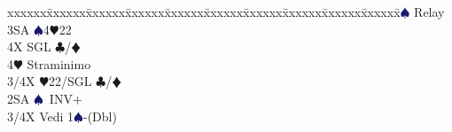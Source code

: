 \documentclass[a4paper,italian]{article}
\newcommand{\BC}{\textcolor{OliveGreen}{$\clubsuit$}}
\newcommand{\BD}{\textcolor{RedOrange}{$\vardiamondsuit$}}
\newcommand{\BH}{\textcolor{Red2}{$\varheartsuit${}}}
\newcommand{\BS}{\textcolor{MidnightBlue}{$\spadesuit${}}}
\newenvironment{bidtable}
{\begin{tabbing}

    xxxxxx\=xxxxxx\=xxxxxx\=xxxxxx\=xxxxxx\=xxxxxx\=xxxxxx\=xxxxxx\=xxxxxx\=xxxxxx\=\kill}
{\end{tabbing} }%
\begin{document}
\begin{multicols}{2}
\begin{bidtable}
                                            3\BS \> Relay\+\\
                                            3SA \BS 4\BH 22\\
                                            4X \> SGL \BC /\BD \\
                                            4\BH \> Straminimo\-\-\\
                                            3/4X \BH 22/SGL \BC /\BD \-\\
                                            2SA \BS\ INV+\\
                                            3/4X \> Vedi 1\BS -(Dbl)\-
                                        \end{bidtable}
                                    \end{multicols}
                                    \newpage
\end{document}

